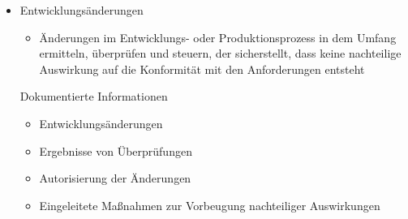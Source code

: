 {\begin{itemize}
\begin{itemize}
		\item Validierungsma{\ss}nahmen - Entwicklung erf\"ullt Anforderungen aus vorgesehener Anwendung oder dem beabsichtigten Gebrauch
		\item Notwendige Ma{\ss}nahmen aus \"Uberpr\"ufung, Verifikation und Validierung werden umgesetzt
		\item Dokumentierte Informationen \"uber diese T\"atigkeiten aufbewahrt werden
		\end{itemize}
\item Entwicklungs\"anderungen
\begin{itemize}
		\item \"Anderungen im Entwicklungs- oder Produktionsprozess in dem Umfang ermitteln, \"uberpr\"ufen und steuern, der sicherstellt, dass keine nachteilige Auswirkung auf die Konformit\"at mit den Anforderungen entsteht
		\end{itemize} Dokumentierte Informationen
		\begin{itemize}
		\item Entwicklungs\"anderungen
		\item Ergebnisse von \"Uberpr\"ufungen
		\item Autorisierung der \"Anderungen
		\item Eingeleitete Ma{\ss}nahmen zur Vorbeugung nachteiliger Auswirkungen
		\end{itemize}
\end{itemize}
}


